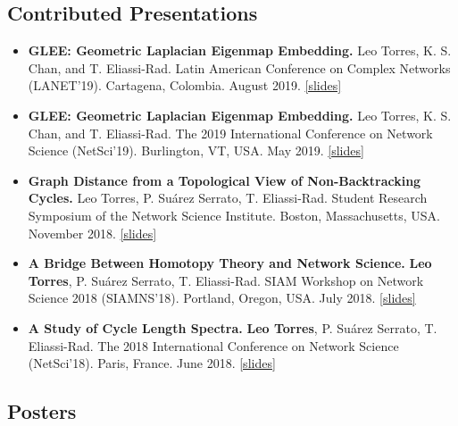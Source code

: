 \documentclass[12pt,]{scrartcl}
\begin{document}
\subsection{Contributed Presentations}\label{contributed-presentations}

\begin{itemize}
\leftskip-0.25in

\item \textbf{GLEE: Geometric Laplacian Eigenmap Embedding.} Leo Torres, K. S. Chan, and T. Eliassi-Rad. Latin American Conference on Complex Networks (LANET'19). Cartagena, Colombia. August 2019. \href{http://leotrs.com/static/GLEE_lanet19.pdf}{[slides]}

\item \textbf{GLEE: Geometric Laplacian Eigenmap Embedding.} Leo Torres, K. S. Chan, and T. Eliassi-Rad. The 2019 International Conference on Network Science (NetSci'19). Burlington, VT, USA. May 2019. \href{http://leotrs.com/static/GLEE_netsci19.pdf}{[slides]}

\item \textbf{Graph Distance from a Topological View of Non-Backtracking Cycles.} Leo Torres, P. Suárez Serrato, T. Eliassi-Rad. Student Research Symposium of the Network Science Institute. Boston, Massachusetts, USA. November 2018. \href{http://leotrs.com/static/netsci18.pdf}{[slides]}

\item \textbf{A Bridge Between Homotopy Theory and Network Science.} \textbf{Leo Torres}, P. Suárez Serrato, T. Eliassi-Rad. SIAM Workshop on Network Science 2018 (SIAMNS'18). Portland, Oregon, USA. July 2018. \href{http://leotrs.com/static/siamns18.pdf}{[slides]}

\item \textbf{A Study of Cycle Length Spectra.} \textbf{Leo Torres}, P. Suárez Serrato, T. Eliassi-Rad. The 2018 International Conference on Network Science (NetSci'18). Paris, France. June 2018. \href{http://leotrs.com/static/netsci18.pdf}{[slides]}

\end{itemize}


\subsection{Posters}\label{posters}
\end{document}
